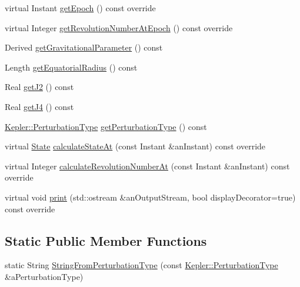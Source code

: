 \begin{DoxyCompactItemize}
\item 
virtual Instant \hyperlink{classostk_1_1astro_1_1trajectory_1_1orbit_1_1models_1_1_kepler_a01551fd006896966d4d5e4442c182f92}{get\+Epoch} () const override
\item 
virtual Integer \hyperlink{classostk_1_1astro_1_1trajectory_1_1orbit_1_1models_1_1_kepler_a2aa5b94462f65ea7e703d319d3e028b3}{get\+Revolution\+Number\+At\+Epoch} () const override
\item 
Derived \hyperlink{classostk_1_1astro_1_1trajectory_1_1orbit_1_1models_1_1_kepler_af7e879bf88e9a388c86d836ac50d6a97}{get\+Gravitational\+Parameter} () const
\item 
Length \hyperlink{classostk_1_1astro_1_1trajectory_1_1orbit_1_1models_1_1_kepler_abd9cabfcb1a39b627d2809d3cb11dad8}{get\+Equatorial\+Radius} () const
\item 
Real \hyperlink{classostk_1_1astro_1_1trajectory_1_1orbit_1_1models_1_1_kepler_aeff5940802c7795d9d709a0fdf15fa64}{get\+J2} () const
\item 
Real \hyperlink{classostk_1_1astro_1_1trajectory_1_1orbit_1_1models_1_1_kepler_a15e3600757f990a833910dc54c389462}{get\+J4} () const
\item 
\hyperlink{classostk_1_1astro_1_1trajectory_1_1orbit_1_1models_1_1_kepler_a3750f9177ff06a1938826e2c2881d5a9}{Kepler\+::\+Perturbation\+Type} \hyperlink{classostk_1_1astro_1_1trajectory_1_1orbit_1_1models_1_1_kepler_a8f6d00fe11481e9267aded6f9aeafb1a}{get\+Perturbation\+Type} () const
\item 
virtual \hyperlink{classostk_1_1astro_1_1trajectory_1_1_state}{State} \hyperlink{classostk_1_1astro_1_1trajectory_1_1orbit_1_1models_1_1_kepler_a4de0c3d7a2b37c1c2ab4d6e207339809}{calculate\+State\+At} (const Instant \&an\+Instant) const override
\item 
virtual Integer \hyperlink{classostk_1_1astro_1_1trajectory_1_1orbit_1_1models_1_1_kepler_a312fe4296eadcb00799ce9981b0c4f18}{calculate\+Revolution\+Number\+At} (const Instant \&an\+Instant) const override
\item 
virtual void \hyperlink{classostk_1_1astro_1_1trajectory_1_1orbit_1_1models_1_1_kepler_a9c71803234f356ade03453e3ae19ae94}{print} (std\+::ostream \&an\+Output\+Stream, bool display\+Decorator=true) const override
\end{DoxyCompactItemize}
\subsection*{Static Public Member Functions}
\begin{DoxyCompactItemize}
\item 
static String \hyperlink{classostk_1_1astro_1_1trajectory_1_1orbit_1_1models_1_1_kepler_ad780ed9b53e355ebef1597f86d30cf84}{String\+From\+Perturbation\+Type} (const \hyperlink{classostk_1_1astro_1_1trajectory_1_1orbit_1_1models_1_1_kepler_a3750f9177ff06a1938826e2c2881d5a9}{Kepler\+::\+Perturbation\+Type} \&a\+Perturbation\+Type)
\end{DoxyCompactItemize}
